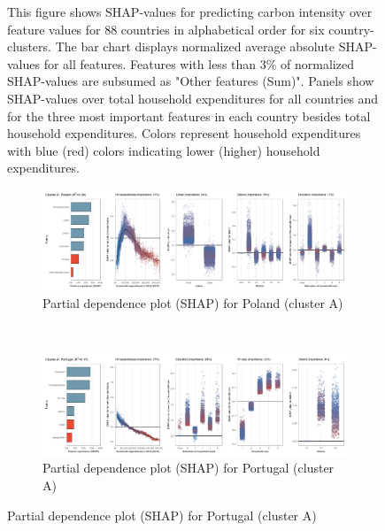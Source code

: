 \begin{figure}[ht!]
    \begin{subcaption2}
     This figure shows SHAP-values for predicting carbon intensity over feature values for 88 countries in alphabetical order for six country-clusters. The bar chart displays normalized average absolute SHAP-values for all features. Features with less than 3\% of normalized SHAP-values are subsumed as "Other features (Sum)". Panels show SHAP-values over total household expenditures for all countries and for the three most important features in each country besides total household expenditures. Colors represent household expenditures with blue (red) colors indicating lower (higher) household expenditures.
     \end{subcaption2}
\end{figure}

\begin{figure}[ht!]\ContinuedFloat
    \centering
   \begin{subfigure}[b]{\textwidth}
   \centering
         \caption{Partial dependence plot (SHAP) for Poland (cluster A)}
         \label{fig:5b_POL}
         \includegraphics[width=\textwidth]{Figure 5b/Figure_5b_POL}         
     \end{subfigure}
    \\
    \vspace{0.5cm}
    \begin{subfigure}[b]{\textwidth}
   \centering
         \caption{Partial dependence plot (SHAP) for Portugal (cluster A)}
         \label{fig:5b_PRT}
         \includegraphics[width=\textwidth]{Figure 5b/Figure_5b_PRT}
         \end{subfigure}

\end{figure}
